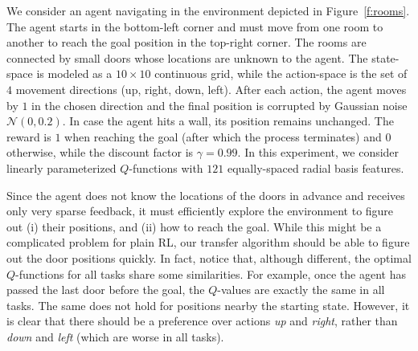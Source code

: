 \documentclass{article}
\begin{document}
We consider an agent navigating in the environment depicted in Figure~\ref{f:rooms}. The agent starts in the bottom-left corner and must move from one room to another to reach the goal position in the top-right corner. The rooms are connected by small doors whose locations are unknown to the agent. The state-space is modeled as a $10 \times 10$ continuous grid, while the action-space is the set of $4$ movement directions (up, right, down, left). After each action, the agent moves by $1$ in the chosen direction and the final position is corrupted by Gaussian noise $\mathcal{N}(0,0.2)$. In case the agent hits a wall, its position remains unchanged. The reward is $1$ when reaching the goal (after which the process terminates) and $0$ otherwise, while the discount factor is $\gamma = 0.99$. In this experiment, we consider linearly parameterized $Q$-functions with $121$ equally-spaced radial basis features.

Since the agent does not know the locations of the doors in advance and receives only very sparse feedback, it must efficiently explore the environment to figure out (i) their positions, and (ii) how to reach the goal. While this might be a complicated problem for plain RL, our transfer algorithm should be able to figure out the door positions quickly. In fact, notice that, although different, the optimal $Q$-functions for all tasks share some similarities. For example, once the agent has passed the last door before the goal, the $Q$-values are exactly the same in all tasks. The same does not hold for positions nearby the starting state. However, it is clear that there should be a preference over actions \textit{up} and \textit{right}, rather than \textit{down} and \textit{left} (which are worse in all tasks).
\end{document}
